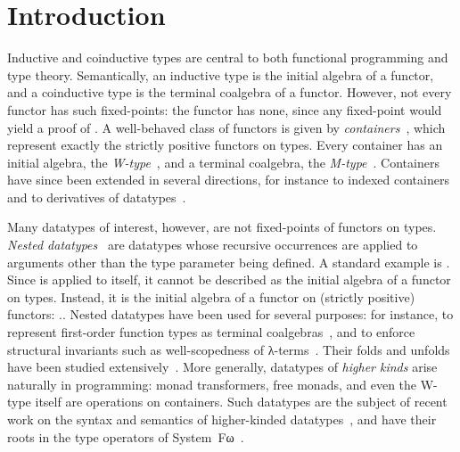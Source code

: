 \section{Introduction}
\label{sec:introduction}

Inductive and coinductive types are central to both functional programming and type theory. Semantically, an inductive type is the initial algebra of a functor, and a coinductive type is the terminal coalgebra of a functor. However, not every functor has such fixed-points: the functor \;\;\AgdaSymbol{(}\;\;\AgdaSymbol{)} has none, since any fixed-point would yield a proof of . A well-behaved class of functors is given by \emph{containers}~\cite{AbbottAG03,AbbottAG05}, which represent exactly the strictly positive functors on types. Every container has an initial algebra, the \emph{W-type}~\cite{MartinLof84,GambinoH03}, and a terminal coalgebra, the \emph{M-type}~\cite{AhrensCS15}. Containers have since been extended in several directions, for instance to indexed containers~\cite{AltenkirchGHMM15} and to derivatives of datatypes~\cite{AbbottAGM05}.

Many datatypes of interest, however, are not fixed-points of functors on types. \emph{Nested datatypes}~\cite{BirdM98} are datatypes whose recursive occurrences are applied to arguments other than the type parameter being defined. A standard example is \;\;\;\;\;\;\;\;\AgdaSymbol{(}\;\AgdaSymbol{)}. Since  is applied to itself, it cannot be described as the initial algebra of a functor on types. Instead, it is the initial algebra of a functor on (strictly positive) functors: \;\;.\;\;\;\;\;\;\AgdaSymbol{(}\;\AgdaSymbol{)}. Nested datatypes have been used for several purposes: for instance, to represent first-order function types as terminal coalgebras~\cite{Altenkirch01}, and to enforce structural invariants such as well-scopedness of λ-terms~\cite{BirdP99b}. Their folds and unfolds have been studied extensively~\cite{BirdP99a,MatthesAU05,JohannG07}. More generally, datatypes of \emph{higher kinds} arise naturally in programming: monad transformers, free monads, and even the W-type itself are operations on containers. Such datatypes are the subject of recent work on the syntax and semantics of higher-kinded datatypes~\cite{JohannP19}, and have their roots in the type operators of System~Fω~\cite{Girard72}.

